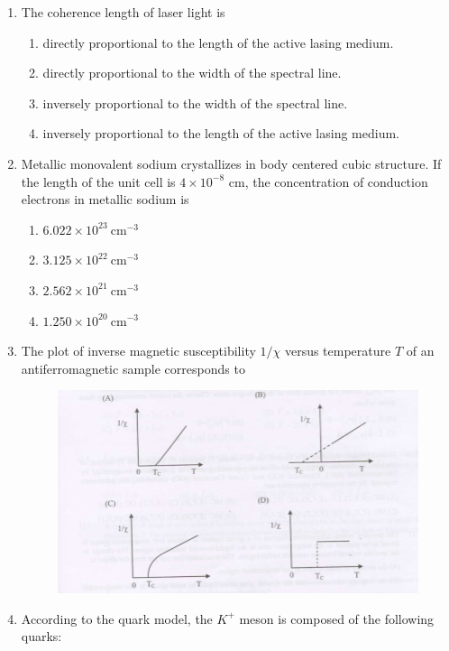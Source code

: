 \documentclass[journal,12pt,onecolumn]{IEEEtran}
\theoremstyle{remark}
\begin{document}
\begin{enumerate}
\item The coherence length of laser light is 

\hfill{}
    \begin{enumerate}
        \item directly proportional to the length of the active lasing medium.
        \item directly proportional to the width of the spectral line.
        \item inversely proportional to the width of the spectral line.
        \item inversely proportional to the length of the active lasing medium.
    \end{enumerate}

\newpage
\item Metallic monovalent sodium crystallizes in body centered cubic structure. If the length of the unit cell is $4 \times 10^{-8}$ cm, the concentration of conduction electrons in metallic sodium is 

\hfill{}
\begin{multicols}{4}
    \begin{enumerate}
        \item $6.022 \times 10^{23} \ \text{cm}^{-3}$
        \item $3.125 \times 10^{22} \ \text{cm}^{-3}$
        \item $2.562 \times 10^{21} \ \text{cm}^{-3}$
        \item $1.250 \times 10^{20} \ \text{cm}^{-3}$
    \end{enumerate}
\end{multicols}


\item The plot of inverse magnetic susceptibility $1/\chi$ versus temperature $T$ of an antiferromagnetic sample corresponds to

\hfill{}
\begin{figure}[H]
    \centering
    \includegraphics[width = 0.6\columnwidth]{fig/Q.16.png}
    \caption*{}
    \label{fig:Q,16}
\end{figure}
\item According to the quark model, the $K^+$ meson is composed of the following quarks:


\end{enumerate}
\end{document}
